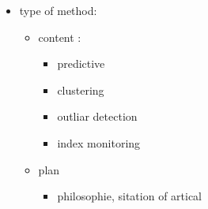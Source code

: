 \documentclass[./overview.tex]{subfiles}
\begin{document}
    \begin{itemize}
        \item type of method:
        \begin{itemize}
            \item content :
            \begin{itemize}
                \item predictive
                \item clustering 
                \item outliar detection
                \item index monitoring
            \end{itemize}
            \item plan
            \begin{itemize}
                \item philosophie, sitation of artical 
            \end{itemize}
        \end{itemize}
    \end{itemize}
\end{document}
